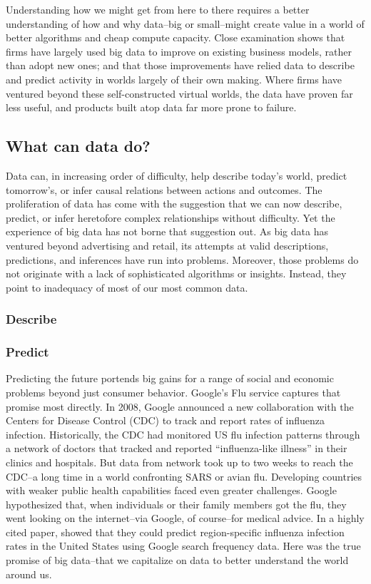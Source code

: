 \documentclass[12pt]{article}
\begin{document}
Understanding how we might get from here to there requires a better
understanding of how and why data--big or small--might create value in
a world of better algorithms and cheap compute capacity. Close
examination shows that firms have largely used big data to improve on
existing business models, rather than adopt new ones; and that those
improvements have relied data to describe and predict activity in
worlds largely of their own making. Where firms have ventured beyond
these self-constructed virtual worlds, the data have proven far less
useful, and products built atop data far more prone to failure. 

\subsection{What can data do?}
\label{sec:what-can-data}

Data can, in increasing order of difficulty, help describe today's
world, predict tomorrow's, or infer causal relations between actions
and outcomes. The proliferation of data has come with the suggestion
that we can now describe, predict, or infer heretofore complex
relationships without difficulty. Yet the experience of big data has
not borne that suggestion out. As big data has ventured beyond
advertising and retail, its attempts at valid descriptions,
predictions, and inferences have run into problems. Moreover, those
problems do not originate with a lack of sophisticated algorithms or
insights. Instead, they point to inadequacy of most of our most common
data. 

\subsubsection{Describe}
\label{sec:describe}


\subsubsection{Predict}
\label{sec:predict}

Predicting the future portends big gains for a range of social and
economic problems beyond just consumer behavior. Google's Flu service
captures that promise most directly. In 2008, Google announced a new
collaboration with the Centers for Disease Control (CDC) to track and report
rates of influenza infection. Historically, the CDC had monitored US
flu infection patterns through a network of doctors that tracked and
reported ``influenza-like illness'' in their clinics and
hospitals. But data from network took up to two weeks to reach the
CDC--a long time in a world confronting SARS or avian flu. Developing
countries with weaker public health capabilities faced even greater
challenges. Google hypothesized that, when individuals or their family
members got the flu, they went looking on the internet--via Google, of
course--for medical
advice. In a highly cited paper, \cite{ginsberg2008detecting} showed
that they could predict region-specific influenza infection rates in the United
States using Google search frequency data. Here was the true promise
of big data--that we capitalize on data to better understand the world around us. 
\end{document}
